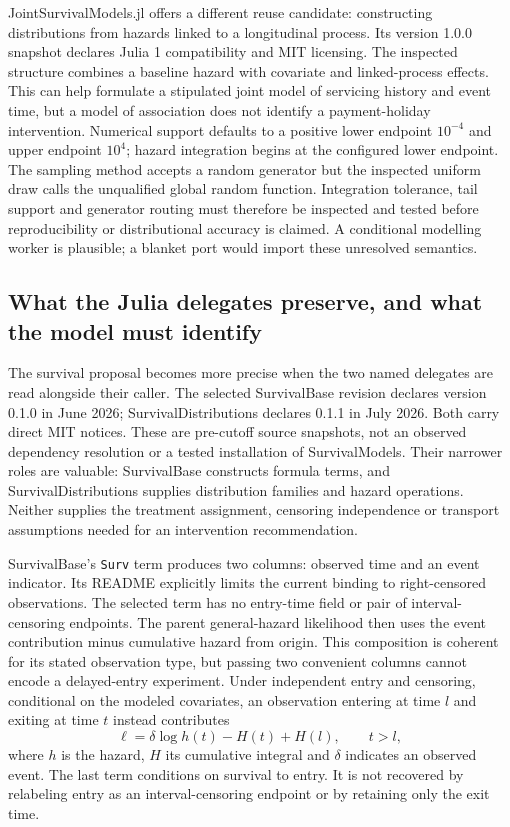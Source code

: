 JointSurvivalModels.jl offers a different reuse candidate: constructing distributions
from hazards linked to a longitudinal process. Its version 1.0.0 snapshot declares
Julia 1 compatibility and MIT licensing. The inspected structure combines a baseline
hazard with covariate and linked-process effects. This can help formulate a stipulated
joint model of servicing history and event time, but a model of association does not
identify a payment-holiday intervention. Numerical support defaults to a positive
lower endpoint $10^{-4}$ and upper endpoint $10^4$; hazard integration begins at
the configured lower endpoint. The sampling method accepts a random generator but
the inspected uniform draw calls the unqualified global random function. Integration
tolerance, tail support and generator routing must therefore be inspected and tested
before reproducibility or distributional accuracy is claimed. A conditional modelling
worker is plausible; a blanket port would import these unresolved semantics.
\citep{exec24_survivalother_juliajoint}

\subsection{What the Julia delegates preserve, and what the model must identify}
\label{rel22:survival-delegates}

The survival proposal becomes more precise when the two named delegates are
read alongside their caller. The selected SurvivalBase revision declares
version 0.1.0 in June 2026; SurvivalDistributions declares 0.1.1 in July 2026.
Both carry direct MIT notices. These are pre-cutoff source snapshots, not an
observed dependency resolution or a tested installation of SurvivalModels.
Their narrower roles are valuable: SurvivalBase constructs formula terms,
and SurvivalDistributions supplies distribution families and hazard operations.
Neither supplies the treatment assignment, censoring independence or
transport assumptions needed for an intervention recommendation.
\citep{rel22survbase,rel22survdist,rel22survcaller}

SurvivalBase's \texttt{Surv} term produces two columns: observed time and an
event indicator. Its README explicitly limits the current binding to
right-censored observations. The selected term has no entry-time field or
pair of interval-censoring endpoints. The parent general-hazard likelihood
then uses the event contribution minus cumulative hazard from origin. This
composition is coherent for its stated observation type, but passing two
convenient columns cannot encode a delayed-entry experiment. Under independent
entry and censoring, conditional on the modeled covariates, an observation
entering at time $l$ and exiting at time $t$ instead contributes
\begin{equation}
 \ell=\delta\log h(t)-H(t)+H(l),\qquad t>l,
 \label{rel22:entry-likelihood}
\end{equation}
where $h$ is the hazard, $H$ its cumulative integral and $\delta$ indicates an
observed event. The last term conditions on survival to entry. It is not
recovered by relabeling entry as an interval-censoring endpoint or by retaining
only the exit time. \citep{rel22survbase,rel22survcaller,rel22survwitness}

